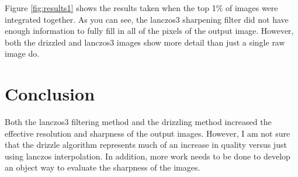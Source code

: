 \documentclass[conference]{IEEEtran}
\begin{document}
Figure \ref{fig:results1} shows the results taken when the top 1\% of
images were integrated together. As you can see, the lanczos3
sharpening filter did not have enough information to fully fill in all
of the pixels of the output image. However, both the drizzled and
lanczos3 images show more detail than just a single raw image do.

\section{Conclusion}
Both the lanczos3 filtering method and the drizzling method increased
the effective resolution and sharpness of the output images. However,
I am not sure that the drizzle algorithm represents much of an
increase in quality versus just using lanczos interpolation. In
addition, more work needs to be done to develop an object way to
evaluate the sharpness of the images.

 
\end{document}
